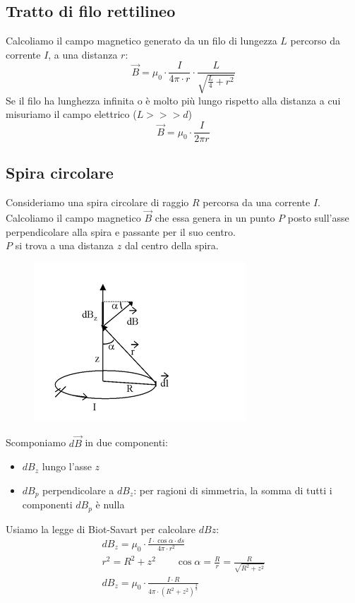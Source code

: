 \subsection{Tratto di filo rettilineo}
Calcoliamo il campo magnetico generato da un filo di lungezza $L$ percorso da corrente $I$, a una distanza $r$:
\begin{displaymath}
	\vec{B} = \mu_0 \cdot  \frac{I}{4 \pi \cdot r} \cdot  \frac{L}{\sqrt{\frac{L}{4} + r^2}}
\end{displaymath}
Se il filo ha lunghezza infinita o è molto più lungo rispetto alla distanza a cui misuriamo il campo elettrico ($L>>>d$)
\begin{displaymath}
	\vec{B}=\mu_0 \cdot \frac{I}{2 \pi r}
\end{displaymath}

\subsection{Spira circolare}
Consideriamo una spira circolare di raggio $R$ percorsa da una corrente $I$.\\
Calcoliamo il campo magnetico $\vec{B}$ che essa genera in un punto $P$ posto sull'asse perpendicolare alla spira e passante per il suo centro.\\
$P$ si trova a una distanza $z$ dal centro della spira.
\begin{figure}[h!]
	\centering
	\includegraphics[]{Pictures/biotSavart.png}
\end{figure}
Scomponiamo $d\vec{B}$ in due componenti:
\begin{itemize}
\item{$dB_z$ lungo l'asse $z$}
\item{$dB_p$ perpendicolare a $dB_z$: per ragioni di simmetria, la somma di tutti i componenti $dB_p$ è nulla}
\end{itemize}
Usiamo la legge di Biot-Savart per calcolare $dBz$:
\begin{displaymath}\begin{aligned}
	dB_z = \mu_0 \cdot \frac{I \cdot \cos{\alpha} \cdot ds}{4\pi \cdot r^2}\\
    r^2 = R^2 + z^2 \qquad \cos{\alpha} = \frac{R}{r} = \frac{R}{\sqrt{R^2 + z^2}}\\
    dB_z = \mu_0 \cdot \frac{I \cdot R}{4\pi \cdot (R^2 + z^2)^\frac{3}{2}}\\
\end{aligned}\end{displaymath}

